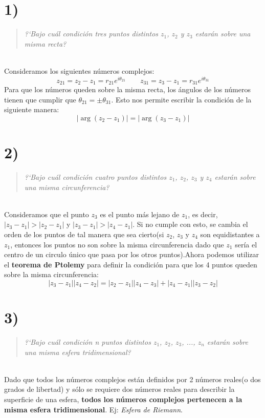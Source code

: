 \documentclass{article}
\begin{document}

\section*{1)}
\begin{quote}
\textit{?`Bajo cuál condición tres puntos distintos $z_1$, $z_2$ y $z_3$ estarán sobre una misma recta?}
\end{quote}\hspace{0.5cm}\\
Consideramos los siguientes números complejos:
$$ z_{21}=z_2 - z_1=r_{21}e^{i\theta_{21}} \qquad z_{31}=z_3 - z_1=r_{31}e^{i\theta_{31}}$$
Para que los números queden sobre la misma recta, los ángulos de los números tienen que cumplir que $\theta_{21}=\pm \theta_{31}$. Esto nos permite escribir la condición de la siguiente manera:
$$\boxed{|\arg\left(z_2 - z_1\right)|=|\arg\left(z_3 - z_1\right)|}$$

\section*{2)}
\begin{quote}
\textit{?`Bajo cuál condición cuatro puntos distintos $z_1$, $z_2$, $z_3$ y $z_4$ estarán sobre una misma circunferencia?}
\end{quote}\hspace{0.5cm}\\
Consideramos que el punto $z_3$ es el punto más lejano de $z_1$, es decir, $|z_3-z_1|>|z_2-z_1|$ y $|z_3-z_1|>|z_4-z_1|$. Si no cumple con esto, se cambia el orden de los puntos de tal manera que sea cierto(si $z_2$, $z_3$ y $z_4$ son equidistantes a $z_1$, entonces los puntos no son sobre la misma circunferencia dado que $z_1$ sería el centro de un circulo único que pasa por los otros puntos).Ahora podemos utilizar el \textbf{teorema de Ptolemy} para definir la condición para que los 4 puntos queden sobre la misma circunferencia:
$$\boxed{|z_3-z_1||z_4-z_2|=|z_2-z_1||z_4-z_3|+|z_4-z_1||z_3-z_2| } $$

\section*{3)}
\begin{quote}
\textit{?`Bajo cuál condición n puntos distintos $z_1$, $z_2$, $z_3$, ..., $z_n$ estarán sobre una misma esfera tridimensional?}
\end{quote}\hspace{0.5cm}\\
Dado que todos los números complejos están definidos por 2 números reales(o dos grados de libertad) y sólo se requiere dos números reales para describir la superficie de una esfera, \textbf{todos los números complejos pertenecen a la misma esfera tridimensional}. Ej: \emph{Esfera de Riemann}.
\end{document}
